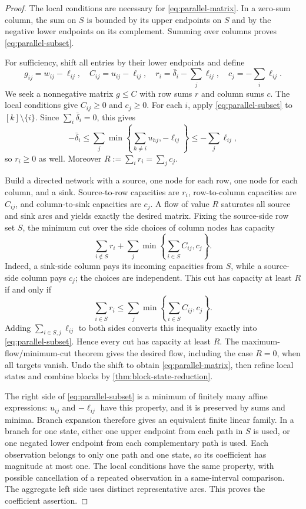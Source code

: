 \begin{proof}
The local conditions are necessary for \eqref{eq:parallel-matrix}.
In a zero-sum column, the sum on $S$ is bounded by its upper endpoints
on $S$ and by the negative lower endpoints on its complement. Summing
over columns proves \eqref{eq:parallel-subset}.

For sufficiency, shift all entries by their lower endpoints and define
\begin{equation}\label{eq:transport-shift}
 g_{ij}=w_{ij}-\ell_{ij},\quad C_{ij}=u_{ij}-\ell_{ij},\quad
 r_i=\bar\delta_i-\sum_j\ell_{ij},\quad c_j=-\sum_i\ell_{ij}.
\end{equation}
We seek a nonnegative matrix $g\le C$ with row sums $r$ and column
sums $c$. The local conditions give $C_{ij}\ge0$ and $c_j\ge0$.
For each $i$, apply \eqref{eq:parallel-subset} to $[k]\setminus\{i\}$.
Since $\sum_i\bar\delta_i=0$, this gives
\[
 -\bar\delta_i\le\sum_j
 \min\left\{\sum_{h\ne i}u_{hj},-\ell_{ij}\right\}
 \le-\sum_j\ell_{ij},
\]
so $r_i\ge0$ as well. Moreover $R:=\sum_ir_i=\sum_jc_j$.

Build a directed network with a source, one node for each row, one node
for each column, and a sink. Source-to-row capacities are $r_i$,
row-to-column capacities are $C_{ij}$, and column-to-sink capacities are
$c_j$. A flow of value $R$ saturates all source and sink arcs and yields
exactly the desired matrix. Fixing the source-side row set $S$, the
minimum cut over the side choices of column nodes has capacity
\begin{equation}\label{eq:transport-cut}
 \sum_{i\notin S}r_i+
       \sum_j\min\left\{\sum_{i\in S}C_{ij},c_j\right\}.
\end{equation}
Indeed, a sink-side column pays its incoming capacities from $S$, while
a source-side column pays $c_j$; the choices are independent. This cut
has capacity at least $R$ if and only if
\[
 \sum_{i\in S}r_i\le\sum_j
            \min\left\{\sum_{i\in S}C_{ij},c_j\right\}.
\]
Adding $\sum_{i\in S,j}\ell_{ij}$ to both sides converts this
inequality exactly into \eqref{eq:parallel-subset}. Hence every cut has
capacity at least $R$. The maximum-flow/minimum-cut theorem
\citep{FordFulkerson1956Flow} gives the desired flow, including the case
$R=0$, when all targets vanish. Undo the shift to obtain
\eqref{eq:parallel-matrix}, then refine local states and combine blocks
by \cref{thm:block-state-reduction}.

The right side of \eqref{eq:parallel-subset} is a minimum of finitely
many affine expressions: $u_{ij}$ and $-\ell_{ij}$ have this property,
and it is preserved by sums and minima. Branch expansion therefore
gives an equivalent finite linear family. In a branch for one state,
either one upper endpoint from each path in $S$ is used, or one negated
lower endpoint from each complementary path is used. Each observation
belongs to only one path and one state, so its coefficient has magnitude
at most one. The local conditions have the same property, with possible
cancellation of a repeated observation in a same-interval comparison.
The aggregate left side uses distinct representative arcs. This proves
the coefficient assertion.
\end{proof}

